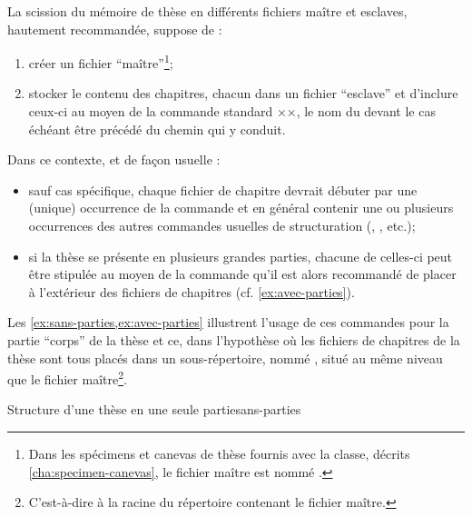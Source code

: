 La scission du mémoire de thèse en différents fichiers maître et esclaves,
hautement recommandée, suppose de :
\begin{enumerate}
\item créer un fichier \enquote{maître}\footnote{Dans les spécimens et canevas
    de thèse fournis avec la classe, décrits \vref{cha:specimen-canevas}, le
    fichier maître est nommé .};
\item stocker le contenu des chapitres, chacun dans un fichier
  \enquote{esclave}
  et d'inclure ceux-ci au moyen de la commande
  standard ××, le nom du  devant le cas échéant être précédé du chemin qui y
  conduit.
\end{enumerate}
%
Dans ce contexte, et de façon usuelle :
\begin{itemize}
\item sauf cas spécifique, chaque fichier de chapitre devrait débuter par une
  (unique) occurrence de la commande  et en général
  contenir une ou plusieurs occurrences des autres commandes usuelles de
  structuration (, , etc.);
\item si la thèse se présente en plusieurs grandes parties, chacune
  de celles-ci peut être stipulée au moyen de la commande
   qu'il est alors recommandé de placer à
  l'extérieur des fichiers de chapitres (cf.
  \vref{ex:avec-parties}).
\end{itemize}
%
Les \vref{ex:sans-parties,ex:avec-parties} illustrent l'usage de ces commandes
pour la partie \enquote{corps} de la thèse et ce, dans l'hypothèse où les
fichiers de chapitres de la thèse sont tous placés dans un sous-répertoire,
nommé , situé au même niveau que le fichier
maître\footnote{C'est-à-dire à la racine du répertoire contenant le fichier
  maître.}.
\begin{dbexample}{Structure d'une thèse en une seule partie}{sans-parties}
\begin{bodycode}
÷}
÷}
...
÷}
÷}
\end{bodycode}
\end{dbexample}
